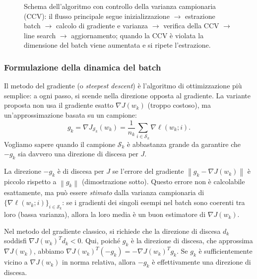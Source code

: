 \documentclass[a4paper,12pt]{article}
\numberwithin{equation}{section}
\numberwithin{figure}{section}
\numberwithin{table}{section}
\newcommand{\norm}[1]{\left\|#1\right\|}
\begin{document}
\begin{figure}[h]
{}
\caption{Schema dell'algoritmo con controllo della varianza campionaria (CCV):
il flusso principale segue inizializzazione $\to$ estrazione batch $\to$
calcolo di gradiente e varianza $\to$ verifica della CCV $\to$ line search
$\to$ aggiornamento; quando la CCV \`e violata la dimensione del batch viene
aumentata e si ripete l'estrazione.}
\label{fig:block_diagram}
\end{figure}

\subsubsection{Formulazione della dinamica del batch}

Il metodo del gradiente (o \emph{steepest descent}) \`e l'algoritmo di ottimizzazione pi\`u semplice: a ogni passo, si scende nella direzione opposta al gradiente. La variante proposta non usa il gradiente esatto $\nabla J(w_k)$ (troppo costoso), ma un'approssimazione basata su un campione:
\[
  g_k = \nabla J_{\mathcal{S}_k}(w_k) = \frac{1}{n_k}\sum_{i \in \mathcal{S}_k} \nabla \ell(w_k;i).
\]
Vogliamo sapere quando il campione $\mathcal{S}_k$ \`e abbastanza grande da garantire che $-g_k$ sia davvero una direzione di discesa per $J$.

La direzione $-g_k$ è di discesa per $J$ se l'errore del gradiente $\norm{g_k - \nabla J(w_k)}$ \`e piccolo rispetto a $\norm{g_k}$ (dimostrazione sotto). Questo errore non \`e calcolabile esattamente, ma pu\`o essere \emph{stimato} dalla varianza campionaria di $\{{\nabla \ell(w_k;i)}\}_{i \in \mathcal{S}_k}$: se i gradienti dei singoli esempi nel batch sono coerenti tra loro (bassa varianza), allora la loro media \`e un buon estimatore di $\nabla J(w_k)$.

  Nel metodo del gradiente classico, si richiede che la direzione di discesa $d_k$ soddisfi $\nabla J(w_k)^T d_k < 0$. Qui, poiché $g_k$ è la direzione di discesa, che approssima $\nabla J(w_k)$, abbiamo $\nabla J(w_k)^T (-g_k) = - \nabla J(w_k)^T g_k$. Se $g_k$ è sufficientemente vicino a $\nabla J(w_k)$ in norma relativa, allora $-g_k$ è effettivamente una direzione di discesa.
\end{document}
